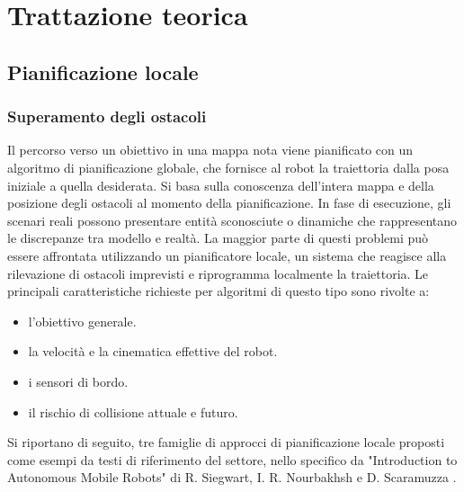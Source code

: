 \section{Trattazione teorica}

\subsection{Pianificazione locale}
\subsubsection{Superamento degli ostacoli}
Il percorso verso un obiettivo in una mappa nota viene pianificato con un algoritmo di pianificazione globale, che fornisce al robot la traiettoria dalla posa iniziale a quella desiderata. Si basa sulla conoscenza dell'intera mappa e della posizione degli ostacoli al momento della pianificazione. In fase di esecuzione, gli scenari reali possono presentare entità sconosciute o dinamiche che rappresentano le discrepanze tra modello e realtà. La maggior parte di questi problemi può essere affrontata utilizzando un pianificatore locale, un sistema che reagisce alla rilevazione di ostacoli imprevisti e riprogramma localmente la traiettoria. Le principali caratteristiche richieste per algoritmi di questo tipo sono rivolte a: 
\begin{itemize}
    \item l'obiettivo generale.
    \item la velocità e la cinematica effettive del robot.
    \item i sensori di bordo.
    \item il rischio di collisione attuale e futuro.
\end{itemize}
Si riportano di seguito, tre famiglie di approcci di pianificazione locale proposti come esempi da testi di riferimento del settore, nello specifico da "Introduction to Autonomous Mobile Robots" di R. Siegwart, I. R. Nourbakhsh e D. Scaramuzza \cite{siegwart2011introduction}.

